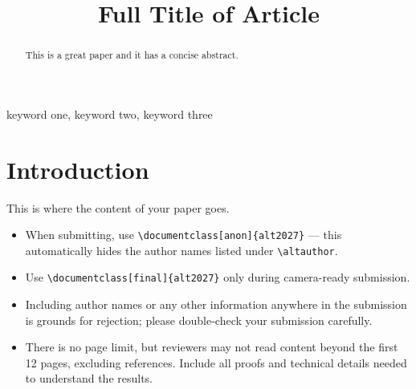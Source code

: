 \documentclass[anon]{alt2027} %
\title[Short Title]{Full Title of Article}
\begin{document}
\maketitle

\begin{abstract}%
  This is a great paper and it has a concise abstract.%
\end{abstract}

\begin{keywords}%
  keyword one, keyword two, keyword three
\end{keywords}

\section{Introduction}

This is where the content of your paper goes.
\begin{itemize}
  \item When submitting, use \texttt{\textbackslash documentclass[anon]\{alt2027\}}
    --- this automatically hides the author names listed under \texttt{\textbackslash altauthor}.
    
  \item Use \texttt{\textbackslash documentclass[final]\{alt2027\}} only during camera-ready submission.

  \item
    Including author names or any other information anywhere in the submission is grounds for rejection;
    please double-check your submission carefully.

  \item There is no page limit, but reviewers may not read content beyond the
    first 12 pages, excluding references. Include all proofs and technical
    details needed to understand the results.

\end{itemize}


\end{document}
